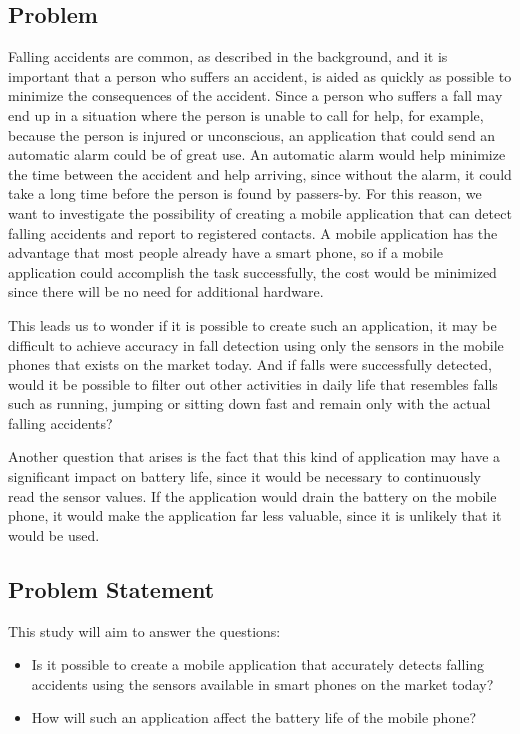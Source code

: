 \documentclass[12pt, a4paper, onecolumn]{article}
\begin{document}
	
	\tableofcontents
	\newpage

\subsection{Problem}

Falling accidents are common, as described in the background, and it is important that a person who suffers an accident, is aided as quickly as possible to minimize the consequences of the accident. Since a person who suffers a fall may end up in a situation where the person is unable to call for help, for example, because the person is injured or unconscious, an application that could send an automatic alarm could be of great use. An automatic alarm would help minimize the time between the accident and help arriving, since without the alarm, it could take a long time before the person is found by passers-by. For this reason, we want to investigate the possibility of creating a mobile application that can detect falling accidents and report to registered contacts. A mobile application has the advantage that most people already have a smart phone, so if a mobile application could accomplish the task successfully, the cost would be minimized since there will be no need for additional hardware.

This leads us to wonder if it is possible to create such an application, it may be difficult to achieve accuracy in fall detection using only the sensors in the mobile phones that exists on the market today. And if falls were successfully detected, would it be possible to filter out other activities in daily life that resembles falls such as running, jumping or sitting down fast and remain only with the actual falling accidents?

Another question that arises is the fact that this kind of application may have a significant impact on battery life, since it would be necessary to continuously read the sensor values. If the application would drain the battery on the mobile phone, it would make the application far less valuable, since it is unlikely that it would be used.

\subsection{Problem Statement}

This study will aim to answer the questions:

\begin{itemize}
	\item Is it possible to create a mobile application that accurately detects falling accidents using the sensors available in smart phones on the market today?
	\item How will such an application affect the battery life of the mobile phone?
\end{itemize}
\end{document}
